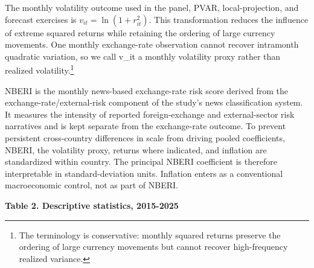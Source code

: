 \documentclass[11pt]{article}
\begin{document}
The monthly volatility outcome used in the panel, PVAR,
local-projection, and forecast exercises is \(v_{it}=\ln(1+r_{it}^{2})\).
This transformation reduces the influence of extreme squared returns
while retaining the ordering of large currency movements. One monthly
exchange-rate observation cannot recover intramonth quadratic
variation, so we call v\_it a monthly volatility proxy rather than
realized volatility.\footnote{The terminology is conservative: monthly squared returns preserve the ordering of large currency movements but cannot recover high-frequency realized variance.}

NBERI is the monthly news-based exchange-rate risk score derived from
the exchange-rate/external-risk component of the study's
news classification system. It measures the intensity of reported
foreign-exchange and external-sector risk narratives and is kept
separate from the exchange-rate outcome. To prevent persistent
cross-country differences in scale from driving pooled coefficients,
NBERI, the volatility proxy, returns where indicated, and inflation are
standardized within country. The principal NBERI coefficient is
therefore interpretable in standard-deviation units. Inflation enters as
a conventional macroeconomic control, not as part of NBERI.

\textbf{Table 2. Descriptive statistics, 2015-2025}
\end{document}
